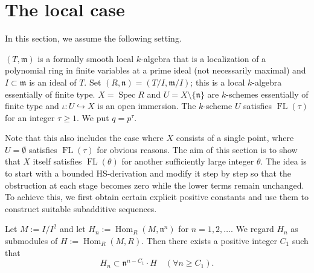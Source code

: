 \documentclass{amsart}
\newcommand{\Hom}{\operatorname{Hom}}
\newcommand{\Spec}{\operatorname{Spec}}
\newcommand{\FL}[1]{\operatorname{FL}(#1)}
\begin{document}
\section{The local case}
In this section, we assume the following setting.

\begin{setting}\label{local setting}
    $(T,\mathfrak{m})$ is a formally smooth local $k$-algebra that is a localization of a polynomial ring in finite variables at a prime ideal (not necessarily maximal) and $I\subset \mathfrak{m}$ is an ideal of $T$. Set $(R,\mathfrak{n})=(T/I,\mathfrak{m}/I)$; this is a local $k$-algebra essentially of finite type. $X=\Spec R$ and $U=X\setminus \{\mathfrak{n}\}$ are $k$-schemes essentially of finite type and $\iota: U\hookrightarrow X$ is an open immersion. The $k$-scheme $U$ satisfies $\FL{\tau}$ for an integer $\tau\ge 1$. We put $q=p^{\tau}$.
\end{setting}

Note that this also includes the case where $X$ consists of a single point, where $U=\emptyset$ satisfies $\FL{\tau}$ for obvious reasons. The aim of this section is to show that $X$ itself satisfies $\FL{\theta}$ for another sufficiently large integer $\theta$. The idea is to start with a bounded HS-derivation and modify it step by step so that the obstruction at each stage becomes zero while the lower terms remain unchanged. To achieve this, we first obtain certain explicit positive constants and use them to construct suitable subadditive sequences.

\begin{lemma}\label{hom lem}
    Let $M:=I/I^2$ and let $H_n:=\Hom_R(M,\mathfrak{n}^n)$ for $n=1,2,\dots.$ We regard $H_n$ as submodules of $H:=\Hom_R(M,R)$. Then there exists a positive integer $C_1$ such that $$H_n\subset \mathfrak{n}^{n-C_1}\cdot H\quad (\forall n\ge C_1).$$
\end{lemma}
\end{document}
